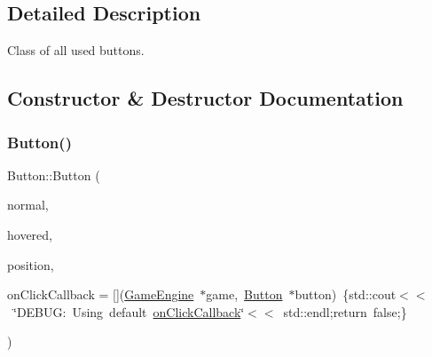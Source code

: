 \subsection{Detailed Description}
Class of all used buttons. 

\subsection{Constructor \& Destructor Documentation}
\mbox{\label{class_button_ad5ab6d97ef7c833c56e968c1202a19b8}} 
\subsubsection{\texorpdfstring{Button()}{Button()}\hspace{0.1cm}{\footnotesize\ttfamily [1/2]}}
{\footnotesize\ttfamily Button\+::\+Button (\begin{DoxyParamCaption}\item[{sf\+::\+Texture $\ast$}]{normal,  }\item[{sf\+::\+Texture $\ast$}]{hovered,  }\item[{const sf\+::\+Vector2f \&}]{position,  }\item[{bool($\ast$)(\mbox{\hyperlink{class_game_engine}{Game\+Engine}} $\ast$game, \mbox{\hyperlink{class_button}{Button}} $\ast$button)}]{on\+Click\+Callback = {\ttfamily \mbox{[}\mbox{]}(\mbox{\hyperlink{class_game_engine}{Game\+Engine}}~$\ast$game,~\mbox{\hyperlink{class_button}{Button}}~$\ast$button)~\{std\+:\+:cout$<$$<$~\char`\"{}DEBUG\+:~Using~default~\mbox{\hyperlink{class_button_a24293b3761997dd52758ee21c0058661}{on\+Click\+Callback}}\char`\"{}$<$$<$~std\+:\+:endl;return~false;\}} }\end{DoxyParamCaption})}

\mbox{\label{class_button_a098eb3dc799079f8c1530eabea57a195}} 

